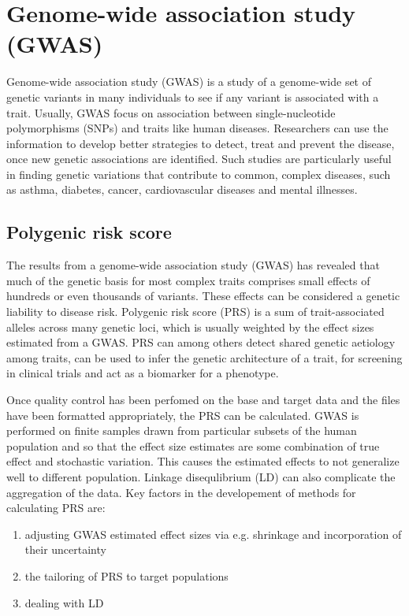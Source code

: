 \section{Genome-wide association study (GWAS)}
\label{sec:background:GWAS}
Genome-wide association study (GWAS) is a study of a genome-wide set of genetic variants in many individuals to see if any variant is associated with a trait. Usually, GWAS focus on association between single-nucleotide polymorphisms (SNPs) and traits like human diseases. Researchers can use the information to develop better strategies to detect, treat and prevent the disease, once new genetic associations are identified. Such studies are particularly useful in finding genetic variations that contribute to common, complex diseases, such as asthma, diabetes, cancer, cardiovascular diseases and mental illnesses. 


\subsection{Polygenic risk score}
\label{sec:background:PRS}
The results from a genome-wide association study (GWAS) has revealed that much of the genetic basis for most complex traits comprises small effects of hundreds or even thousands of variants. These effects can be considered a genetic liability to disease risk. Polygenic risk score (PRS) is a sum of trait-associated alleles across many genetic loci, which is usually weighted by the effect sizes estimated from a GWAS. PRS can among others detect shared genetic aetiology among traits, can be used to infer the genetic architecture of a trait, for screening in clinical trials and act as a biomarker for a phenotype. 

Once quality control has been perfomed on the base and target data and the files have been formatted appropriately, the PRS can be calculated. GWAS is performed on finite samples drawn from particular subsets of the human population and so that the effect size estimates are some combination of true effect and stochastic variation. This causes the estimated effects to not generalize well to different population. Linkage disequlibrium (LD) can also complicate the aggregation of the data. Key factors in the developement of methods for calculating PRS are:
\begin{enumerate}
    \item adjusting GWAS estimated effect sizes via e.g. shrinkage and incorporation of their uncertainty
    \item the tailoring of PRS to target populations
    \item dealing with LD
\end{enumerate}

